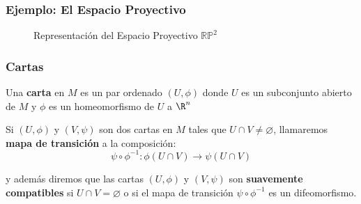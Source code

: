 \begin{frame}
\frametitle{Ejemplo: El Espacio Proyectivo}
\centering
\begin{figure}
  \scalebox{0.75}{}
  \caption{Representación del Espacio Proyectivo $\mathbb{RP}^{2}$}
\end{figure}
\end{frame}

\begin{frame}
\frametitle{Cartas}
\begin{definition}[Carta]
  Una \textbf{carta} en $M$ es un par ordenado $(U,\phi)$ donde $U$ es un subconjunto abierto de $M$ y $\phi$ es un homeomorfismo de $U$ a $\R^n$
\end{definition}\pause

\begin{definition}
  Si $(U,\phi)$ y $(V,\psi)$ son dos cartas en $M$ tales que $U \cap V \neq \varnothing$, llamaremos \textbf{mapa de transición} a la composición:
  \[ \psi \circ \phi^{-1}: \phi(U \cap V) \to \psi(U \cap V) \]
  
  y además diremos que las cartas $(U,\phi)$ y $(V,\psi)$ son \textbf{suavemente compatibles} si $U \cap V = \varnothing$ o si el mapa de transición $\psi \circ \phi^{-1}$ es un difeomorfismo.
\end{definition}
\end{frame}

\begin{frame}
\end{frame}

